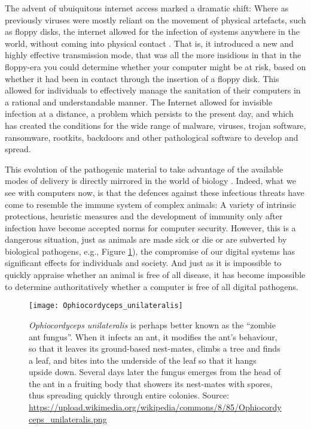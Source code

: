 The advent of ubuiquitous internet access marked a dramatic shift:  Where as previously viruses were mostly reliant on the
movement of physical artefacts, such as floppy disks, the internet allowed for the infection of systems anywhere in the
world, without coming into physical contact .
That is, it introduced a new and highly effective transmission mode, that was all the more insidious in that in the floppy-era
you could determine whether your computer might be at risk, based on whether it had been in contact through the insertion of
a floppy disk.
This allowed for individuals to effectively manage the sanitation of their computers in a rational and understandable manner.
The Internet allowed for invisible infection at a distance, a problem which persists to the present day, and which has created
the conditions for the wide range of malware, viruses, trojan software, ransomware, rootkits, backdoors and other pathological
software to develop and spread.

This evolution of the pathogenic material to take advantage of the available modes of delivery is directly mirrored in the
world of biology \cite{antonovics2017evolution}.
Indeed, what we see with computers now, is that the defences against these infectious threats have come to resemble the
immune system of complex animals: A variety of intrinsic protections, heuristic measures and the development of immunity only
after infection have become accepted norms for computer security.
However, this is a dangerous situation, just as animals are made sick or die or are subverted by biological pathogens, e.g., Figure \ref{fig:antzombies}), the compromise of our digital systems has significant effects for individuals and society.  And just as it is impossible to quickly
appraise whether an animal is free of all disease, it has become impossible to determine authoritatively whether a computer
is free of all digital pathogens.

\begin{figure}
  \centering
  \texttt{[image: Ophiocordyceps\_unilateralis]}
  \caption{
    {\em Ophiocordyceps unilateralis} is perhaps better known as the ``zombie ant fungus''.  When it infects an ant,
    it modifies the ant's behaviour, so that it leaves its ground-based nest-mates, climbs a tree and finds a leaf,
    and bites into the underside of the leaf so that it hangs upside down. Several days later the fungus emerges from
    the head of the ant in a fruiting body that showers its nest-mates with spores, thus spreading quickly through
    entire colonies.  Source: 
    \url{https://upload.wikimedia.org/wikipedia/commons/8/85/Ophiocordyceps_unilateralis.png}
    \label{fig:antzombies}
  }
    
\end{figure}

